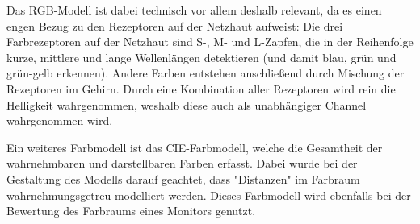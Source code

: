 			Das RGB-Modell ist dabei technisch vor allem deshalb relevant, da es einen engen Bezug zu den Rezeptoren auf der Netzhaut aufweist: Die drei Farbrezeptoren auf der Netzhaut sind S-, M- und L-Zapfen, die in der Reihenfolge kurze, mittlere und lange Wellenlängen detektieren (und damit blau, grün und grün-gelb erkennen). Andere Farben entstehen anschließend durch Mischung der Rezeptoren im Gehirn. Durch eine Kombination aller Rezeptoren wird rein die Helligkeit wahrgenommen, weshalb diese auch als unabhängiger Channel wahrgenommen wird.

			Ein weiteres Farbmodell ist das CIE-Farbmodell, welche die Gesamtheit der wahrnehmbaren und darstellbaren Farben erfasst. Dabei wurde bei der Gestaltung des Modells darauf geachtet, dass "Distanzen" im Farbraum wahrnehmungsgetreu modelliert werden. Dieses Farbmodell wird ebenfalls bei der Bewertung des Farbraums eines Monitors genutzt.

